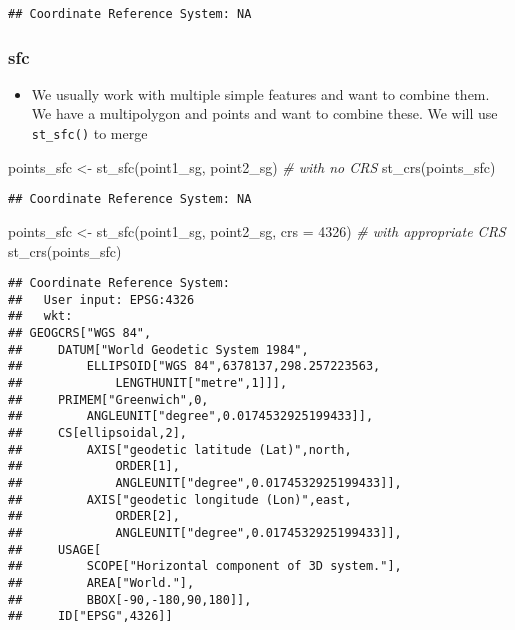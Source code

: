 \documentclass[
]{book}
\newenvironment{Shaded}{\begin{snugshade}}{\end{snugshade}}
\newcommand{\AttributeTok}[1]{\textcolor[rgb]{0.77,0.63,0.00}{#1}}
\newcommand{\CommentTok}[1]{\textcolor[rgb]{0.56,0.35,0.01}{\textit{#1}}}
\newcommand{\DecValTok}[1]{\textcolor[rgb]{0.00,0.00,0.81}{#1}}
\newcommand{\FunctionTok}[1]{\textcolor[rgb]{0.00,0.00,0.00}{#1}}
\newcommand{\NormalTok}[1]{#1}
\newcommand{\OtherTok}[1]{\textcolor[rgb]{0.56,0.35,0.01}{#1}}
\providecommand{\tightlist}{%
  \setlength{\itemsep}{0pt}\setlength{\parskip}{0pt}}
\begin{document}
\begin{verbatim}
## Coordinate Reference System: NA
\end{verbatim}

\hypertarget{sfc}{%
\subsubsection{sfc}\label{sfc}}

\begin{itemize}
\tightlist
\item
  We usually work with multiple simple features and want to combine them. We have a multipolygon and points and want to combine these. We will use \texttt{st\_sfc()} to merge
\end{itemize}

\begin{Shaded}
\begin{Highlighting}[]
\NormalTok{points\_sfc }\OtherTok{\textless{}{-}} \FunctionTok{st\_sfc}\NormalTok{(point1\_sg, point2\_sg)                   }\CommentTok{\# with no CRS}
\FunctionTok{st\_crs}\NormalTok{(points\_sfc)}
\end{Highlighting}
\end{Shaded}

\begin{verbatim}
## Coordinate Reference System: NA
\end{verbatim}

\begin{Shaded}
\begin{Highlighting}[]
\NormalTok{points\_sfc }\OtherTok{\textless{}{-}} \FunctionTok{st\_sfc}\NormalTok{(point1\_sg, point2\_sg, }\AttributeTok{crs =} \DecValTok{4326}\NormalTok{)       }\CommentTok{\# with appropriate CRS}
\FunctionTok{st\_crs}\NormalTok{(points\_sfc)}
\end{Highlighting}
\end{Shaded}

\begin{verbatim}
## Coordinate Reference System:
##   User input: EPSG:4326 
##   wkt:
## GEOGCRS["WGS 84",
##     DATUM["World Geodetic System 1984",
##         ELLIPSOID["WGS 84",6378137,298.257223563,
##             LENGTHUNIT["metre",1]]],
##     PRIMEM["Greenwich",0,
##         ANGLEUNIT["degree",0.0174532925199433]],
##     CS[ellipsoidal,2],
##         AXIS["geodetic latitude (Lat)",north,
##             ORDER[1],
##             ANGLEUNIT["degree",0.0174532925199433]],
##         AXIS["geodetic longitude (Lon)",east,
##             ORDER[2],
##             ANGLEUNIT["degree",0.0174532925199433]],
##     USAGE[
##         SCOPE["Horizontal component of 3D system."],
##         AREA["World."],
##         BBOX[-90,-180,90,180]],
##     ID["EPSG",4326]]
\end{verbatim}
\end{document}
